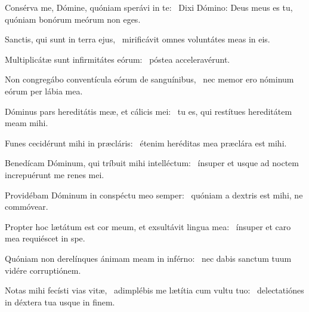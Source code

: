 \item Consérva me, Dómine, quóniam sperávi in te:~\pscross{} Dixi Dómino: Deus meus es tu,~\psstar{} quóniam bonórum meórum non eges.

\item Sanctis, qui sunt in terra ejus,~\psstar{} mirificávit omnes voluntátes meas in eis.

\item Multiplicátæ sunt infirmitátes eórum:~\psstar{} póstea acceleravérunt.

\item Non congregábo conventícula eórum de sanguínibus,~\psstar{} nec memor ero nóminum eórum per lábia mea.

\item Dóminus pars hereditátis meæ, et cálicis mei:~\psstar{} tu es, qui restítues hereditátem meam mihi.

\item Funes cecidérunt mihi in præcláris:~\psstar{} étenim heréditas mea præclára est mihi.

\item Benedícam Dóminum, qui tríbuit mihi intelléctum:~\psstar{} ínsuper et usque ad noctem increpuérunt me renes mei.

\item Providébam Dóminum in conspéctu meo semper:~\psstar{} quóniam a dextris est mihi, ne commóvear.

\item Propter hoc lætátum est cor meum, et exsultávit lingua mea:~\psstar{} ínsuper et caro mea requiéscet in spe.

\item Quóniam non derelínques ánimam meam in inférno:~\psstar{} nec dabis sanctum tuum vidére corruptiónem.

\item Notas mihi fecísti vias vitæ,~\pscross{} adimplébis me lætítia cum vultu tuo:~\psstar{} delectatiónes in déxtera tua usque in finem.
